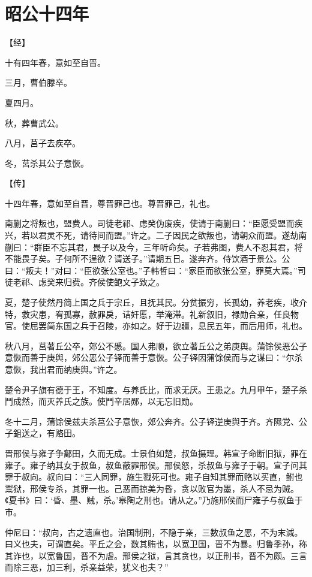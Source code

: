 \documentclass[a4paper,12pt,UTF8,twoside]{ctexbook}
\begin{document}
\section{昭公十四年}



【经】

十有四年春，意如至自晋。

三月，曹伯滕卒。

夏四月。

秋，葬曹武公。

八月，莒子去疾卒。

冬，莒杀其公子意恢。

【传】

十四年春，意如至自晋，尊晋罪己也。尊晋罪己，礼也。

南蒯之将叛也，盟费人。司徒老祁、虑癸伪废疾，使请于南蒯曰：“臣愿受盟而疾兴，若以君灵不死，请待间而盟。”许之。二子因民之欲叛也，请朝众而盟。遂劫南蒯曰：“群臣不忘其君，畏子以及今，三年听命矣。子若弗图，费人不忍其君，将不能畏子矣。子何所不逞欲？请送子。”请期五日。遂奔齐。侍饮酒于景公。公曰：“叛夫！”对曰：“臣欲张公室也。”子韩晳曰：“家臣而欲张公室，罪莫大焉。”司徒老祁、虑癸来归费。齐侯使鲍文子致之。

夏，楚子使然丹简上国之兵于宗丘，且抚其民。分贫振穷，长孤幼，养老疾，收介特，救灾患，宥孤寡，赦罪戾，诘奸慝，举淹滞。礼新叙旧，禄勋合亲，任良物官。使屈罢简东国之兵于召陵，亦如之。好于边疆，息民五年，而后用师，礼也。

秋八月，莒著丘公卒，郊公不慼。国人弗顺，欲立著丘公之弟庚舆。蒲馀侯恶公子意恢而善于庚舆，郊公恶公子铎而善于意恢。公子铎因蒲馀侯而与之谋曰：“尔杀意恢，我出君而纳庚舆。”许之。

楚令尹子旗有德于王，不知度。与养氏比，而求无厌。王患之。九月甲午，楚子杀鬥成然，而灭养氏之族。使鬥辛居郧，以无忘旧勋。

冬十二月，蒲馀侯兹夫杀莒公子意恢，郊公奔齐。公子铎逆庚舆于齐。齐隰党、公子鉏送之，有赂田。

晋邢侯与雍子争鄐田，久而无成。士景伯如楚，叔鱼摄理。韩宣子命断旧狱，罪在雍子。雍子纳其女于叔鱼，叔鱼蔽罪邢侯。邢侯怒，杀叔鱼与雍子于朝。宣子问其罪于叔向。叔向曰：“三人同罪，施生戮死可也。雍子自知其罪而赂以买直，鲋也鬻狱，邢侯专杀，其罪一也。己恶而掠美为昏，贪以败官为墨，杀人不忌为贼。《夏书》曰：‘昏、墨、贼，杀。’皋陶之刑也。请从之。”乃施邢侯而尸雍子与叔鱼于市。

仲尼曰：“叔向，古之遗直也。治国制刑，不隐于亲，三数叔鱼之恶，不为末減。曰义也夫，可谓直矣。平丘之会，数其贿也，以宽卫国，晋不为暴。归鲁季孙，称其诈也，以宽鲁国，晋不为虐。邢侯之狱，言其贪也，以正刑书，晋不为颇。三言而除三恶，加三利，杀亲益荣，犹义也夫？”
\end{document}
